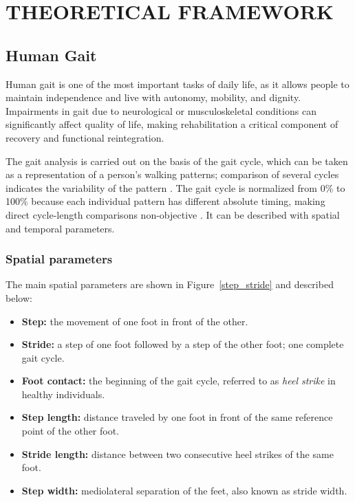 \chapter{THEORETICAL FRAMEWORK}\label{theoretical_framework}
\graphicspath{{images/}}

\section{Human Gait}

Human gait is one of the most important tasks of daily life, as it allows people to maintain independence and live with autonomy, mobility, and dignity.
Impairments in gait due to neurological or musculoskeletal conditions can significantly affect quality of life, making rehabilitation a critical component of recovery and functional reintegration.

The gait analysis is carried out on the basis of the gait cycle, which can be taken as a representation of a person's walking patterns; comparison of several cycles indicates the variability of the pattern \cite{Baker2013}.
The gait cycle is normalized from 0\% to 100\% because each individual pattern has different absolute timing, making direct cycle-length comparisons non-objective \cite{Medved2021}.
It can be described with spatial and temporal parameters.

\subsection{Spatial parameters}

The main spatial parameters are shown in Figure~\ref{step_stride} and described below:

\begin{itemize}
    \item \textbf{Step:} the movement of one foot in front of the other.
    \item \textbf{Stride:} a step of one foot followed by a step of the other foot; one complete gait cycle.
    \item \textbf{Foot contact:} the beginning of the gait cycle, referred to as \textit{heel strike} in healthy individuals.
    \item \textbf{Step length:} distance traveled by one foot in front of the same reference point of the other foot.
    \item \textbf{Stride length:} distance between two consecutive heel strikes of the same foot.
    \item \textbf{Step width:} mediolateral separation of the feet, also known as stride width.
\end{itemize}

